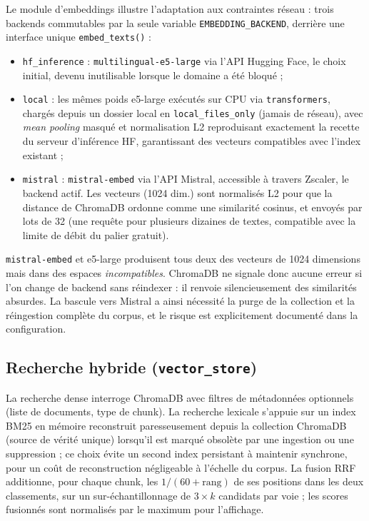 Le module d'embeddings illustre l'adaptation aux contraintes réseau : trois backends
commutables par la seule variable \texttt{EMBEDDING\_BACKEND}, derrière une interface
unique \texttt{embed\_texts()} :

\begin{itemize}
  \item \texttt{hf\_inference} : \texttt{multilingual-e5-large} via l'API Hugging Face,
        le choix initial, devenu inutilisable lorsque le domaine a été bloqué ;
  \item \texttt{local} : les mêmes poids e5-large exécutés sur CPU via
        \texttt{transformers}, chargés depuis un dossier local en
        \texttt{local\_files\_only} (jamais de réseau), avec \emph{mean pooling} masqué et
        normalisation L2 reproduisant exactement la recette du serveur d'inférence HF,
        garantissant des vecteurs compatibles avec l'index existant ;
  \item \texttt{mistral} : \texttt{mistral-embed} via l'API Mistral, accessible à travers
        Zscaler, le backend actif. Les vecteurs (1024 dim.) sont normalisés L2 pour que
        la distance de ChromaDB ordonne comme une similarité cosinus, et envoyés par lots
        de 32 (une requête pour plusieurs dizaines de textes, compatible avec la limite de
        débit du palier gratuit).
\end{itemize}

\begin{alertbox}
\texttt{mistral-embed} et e5-large produisent tous deux des vecteurs de 1024 dimensions
mais dans des espaces \emph{incompatibles}. ChromaDB ne signale donc aucune erreur si l'on
change de backend sans réindexer : il renvoie silencieusement des similarités absurdes.
La bascule vers Mistral a ainsi nécessité la purge de la collection et la réingestion
complète du corpus, et le risque est explicitement documenté dans la configuration.
\end{alertbox}

\subsection{Recherche hybride (\texttt{vector\_store})}

La recherche dense interroge ChromaDB avec filtres de métadonnées optionnels (liste de
documents, type de chunk). La recherche lexicale s'appuie sur un index BM25 en mémoire
reconstruit paresseusement depuis la collection ChromaDB (source de vérité unique)
lorsqu'il est marqué obsolète par une ingestion ou une suppression ; ce choix évite un
second index persistant à maintenir synchrone, pour un coût de reconstruction négligeable
à l'échelle du corpus. La fusion RRF additionne, pour chaque chunk, les
\(1/(60 + \mathrm{rang})\) de ses positions dans les deux classements, sur un
sur-échantillonnage de \(3 \times k\) candidats par voie ; les scores fusionnés sont
normalisés par le maximum pour l'affichage.

